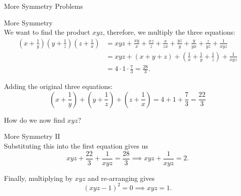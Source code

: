 \documentclass[xcolor=dvipsnames, fontsize=11pt, %
pagesize, %
parskip=half-, t]{beamer}
\begin{document}
\begin{frame}[c]{More Symmetry Problems}
	\centering

\end{frame}

\begin{frame}{More Symmetry}
	 ~\\
	
We want to find the product $xyz$, therefore, we multiply the three equations: \small \begin{align*}\left(x+\frac{1}{y}\right)\left(y+\frac{1}{z}\right)\left(z+\frac{1}{x}\right)&=xyz+\frac{xy}{x}+\frac{xz}{z}+\frac{x}{zx}+\frac{yz}{y}+\frac{y}{yx}+\frac{z}{yz}+\frac{1}{xyz} \\ &= xyz+\left(x+y+z\right)+\left(\frac{1}{x}+\frac{1}{y}+\frac{1}{z}\right)+\frac{1}{xyz} \\ &= 4\cdot 1 \cdot \frac73=\frac{28}{3}. \end{align*}  \normalsize

Adding the original three equations: $$\left(x+\frac{1}{y}\right)+\left(y+\frac{1}{z}\right)+\left(z+\frac{1}{x}\right)=4+1+\frac{7}{3}=\frac{22}{3}$$

How do we now find $xyz$? 

\end{frame}

\begin{frame}{More Symmetry II}
	 ~\\
Substituting this into the first equation gives us $$xyz+\frac{22}{3}+\frac{1}{xyz}=\frac{28}{3}\implies xyz+\frac{1}{xyz}=2.$$

Finally, multiplying by $xyz$ and re-arranging gives $$(xyz-1)^2=0\implies xyz=\boxed{1}.$$
\end{frame}
\end{document}
